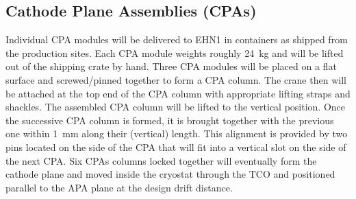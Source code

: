 

\subsection{Cathode Plane Assemblies (CPAs)}



Individual CPA modules will be delivered to EHN1 in containers as shipped from the production sites.  Each CPA module weights roughly 24~kg and will be lifted out of the shipping crate by hand. %
%
%
Three CPA modules will be placed on a flat surface and screwed/pinned together to form a CPA column. 
  The crane %
  then will be attached at the top end of the CPA column with appropriate lifting straps and shackles.  The assembled CPA column will be lifted to the vertical position.  
Once the successive CPA column is formed, it is brought together with the previous one within 1~mm along their (vertical) length. %
This alignment is provided by two pins located on the side of the CPA that will fit into a vertical slot on the side of the next CPA. Six CPAs columns locked together will eventually form the cathode plane and moved inside the cryostat through the TCO and positioned parallel to the APA plane at the design drift distance.

